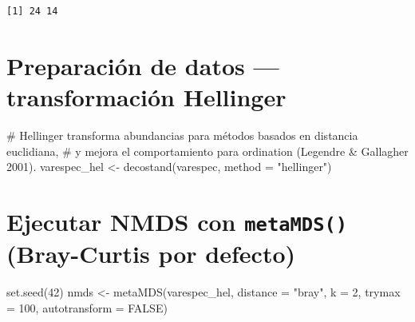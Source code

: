 \documentclass[
  spanish,
  11pt,
  a4paper,
  DIV=11,
  numbers=noendperiod]{scrartcl}
\newenvironment{Shaded}{\begin{snugshade}}{\end{snugshade}}
\newcommand{\AttributeTok}[1]{\textcolor[rgb]{0.40,0.45,0.13}{#1}}
\newcommand{\CommentTok}[1]{\textcolor[rgb]{0.37,0.37,0.37}{#1}}
\newcommand{\ConstantTok}[1]{\textcolor[rgb]{0.56,0.35,0.01}{#1}}
\newcommand{\DecValTok}[1]{\textcolor[rgb]{0.68,0.00,0.00}{#1}}
\newcommand{\FunctionTok}[1]{\textcolor[rgb]{0.28,0.35,0.67}{#1}}
\newcommand{\NormalTok}[1]{\textcolor[rgb]{0.00,0.23,0.31}{#1}}
\newcommand{\OtherTok}[1]{\textcolor[rgb]{0.00,0.23,0.31}{#1}}
\newcommand{\StringTok}[1]{\textcolor[rgb]{0.13,0.47,0.30}{#1}}
\begin{document}
\begin{verbatim}
[1] 24 14
\end{verbatim}

\section{Preparación de datos --- transformación
Hellinger}\label{preparaciuxf3n-de-datos-transformaciuxf3n-hellinger}

\begin{Shaded}
\begin{Highlighting}[numbers=left,,]
\CommentTok{\# Hellinger transforma abundancias para métodos basados en distancia euclidiana,}
\CommentTok{\# y mejora el comportamiento para ordination (Legendre \& Gallagher 2001).}
\NormalTok{varespec\_hel }\OtherTok{\textless{}{-}} \FunctionTok{decostand}\NormalTok{(varespec, }\AttributeTok{method =} \StringTok{"hellinger"}\NormalTok{)}
\end{Highlighting}
\end{Shaded}

\section{\texorpdfstring{Ejecutar NMDS con \texttt{metaMDS()}
(Bray-Curtis por
defecto)}{Ejecutar NMDS con metaMDS() (Bray-Curtis por defecto)}}\label{ejecutar-nmds-con-metamds-bray-curtis-por-defecto}

\begin{Shaded}
\begin{Highlighting}[numbers=left,,]
\FunctionTok{set.seed}\NormalTok{(}\DecValTok{42}\NormalTok{)}
\NormalTok{nmds }\OtherTok{\textless{}{-}} \FunctionTok{metaMDS}\NormalTok{(varespec\_hel, }\AttributeTok{distance =} \StringTok{"bray"}\NormalTok{, }\AttributeTok{k =} \DecValTok{2}\NormalTok{, }\AttributeTok{trymax =} \DecValTok{100}\NormalTok{,}
                \AttributeTok{autotransform =} \ConstantTok{FALSE}\NormalTok{)}
\end{Highlighting}
\end{Shaded}
\end{document}
